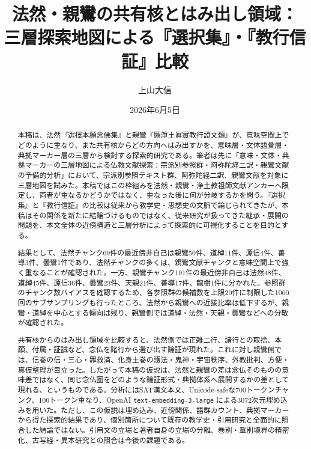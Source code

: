 \documentclass[uplatex,dvipdfmx,11pt,a4paper]{jsarticle}
\title{法然・親鸞の共有核とはみ出し領域：\\[0.35em]三層探索地図による『選択集』・『教行信証』比較}
\author{上山大信}
\date{2026年6月5日}
\begin{document}
\maketitle

\begin{abstract}
本稿は、法然『選擇本願念佛集』と親鸞『顯淨土眞實教行證文類』が、意味空間上でどのように重なり、また共有核からどの方向へはみ出すかを、意味層・文体語彙層・典拠マーカー層の三層から検討する探索的研究である。筆者は先に「意味・文体・典拠マーカーの三層地図による仏教文献探索：宗派別参照群・阿弥陀経二訳・親鸞文献の予備的分析」において、宗派別参照テキスト群、阿弥陀経二訳、親鸞文献を対象に三層地図を試みた\cite{ueyama2026three-layer-map}。本稿ではこの枠組みを法然・親鸞・浄土教祖師文献アンカーへ限定し、両者が重なるかどうかではなく、重なった後に何が分岐するかを問う。『選択集』と『教行信証』の比較は従来から教学史・思想史の文脈で論じられてきたが、本稿はその関係を新たに結論づけるものではなく、従来研究が扱ってきた継承・展開の問題を、本文全体の近傍構造と三層分析によって探索的に可視化することを目的とする。

結果として、法然チャンク69件の最近傍非自己は親鸞50件、道綽11件、源信4件、善導3件、曇鸞1件であり、法然チャンクの多くは、親鸞文献チャンクと意味空間上で強く重なることが確認された。一方、親鸞チャンク191件の最近傍非自己は法然48件、道綽45件、源信36件、曇鸞23件、天親21件、善導17件、龍樹1件に分かれた。参照群のチャンク数バイアスを確認するため、各参照群の候補数を上限20件に制限した1000回のサブサンプリングも行ったところ、法然から親鸞への近接比率は低下するが、親鸞・道綽を中心とする傾向は残り、親鸞側では道綽・法然・天親・曇鸞などへの分散が確認された。

共有核からのはみ出し領域を比較すると、法然側では正雑二行、諸行との取捨、本願、付属・証誠など、念仏を諸行から選び出す論証が現れた。これに対し親鸞側では、信巻の信・三心・罪救済、化身土巻の護法・鬼神・宇宙秩序、外教批判、方便・真仮整理が目立った。したがって本稿の仮説は、法然と親鸞の差は念仏そのものの意味差ではなく、同じ念仏圏をどのような論証形式・典拠体系へ展開するかの差として現れる、というものである。分析にはSAT漢文本文、Unicode-safeな700トークンチャンク、100トークン重なり、OpenAI \texttt{text-embedding-3-large} による3072次元埋め込みを用いた。ただし、この仮説は埋め込み、近傍関係、語群カウント、典拠マーカーから得た探索的結果であり、個別箇所について既存の教学史・引用研究と全面的に照合した結論ではない。引用文の立場と著者自身の立場の分離、巻別・章別境界の精密化、古写経・異本研究との照合は今後の課題である。
\end{abstract}
\end{document}
